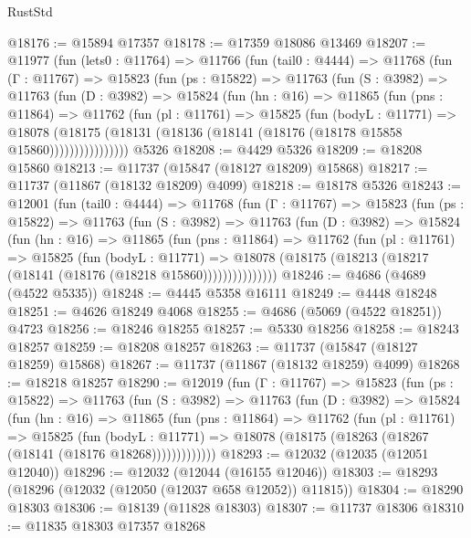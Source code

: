\begin{lexlean}{RustStd}
\begin{coremodule}
@18176 := @15894 @17357
@18178 := @17359 @18086 @13469
@18207 := @11977
    (fun (lets0 : @11764) =>
    @11766
      (fun (tail0 : @4444) =>
      @11768
        (fun (Γ : @11767) =>
        @15823
          (fun (ps : @15822) =>
          @11763
            (fun (S : @3982) =>
            @11763
              (fun (D : @3982) =>
              @15824
                (fun (hn : @16) =>
                @11865
                  (fun (pns : @11864) =>
                  @11762
                    (fun (pl : @11761) =>
                    @15825
                      (fun (bodyL : @11771) =>
                      @18078
                        (@18175
                          (@18131 (@18136 (@18141 (@18176 (@18178 @15858 @15860))))))))))))))))
    @5326
@18208 := @4429 @5326
@18209 := @18208 @15860
@18213 := @11737 (@15847 (@18127 @18209) @15868)
@18217 := @11737 (@11867 (@18132 @18209) @4099)
@18218 := @18178 @5326
@18243 := @12001
    (fun (tail0 : @4444) =>
    @11768
      (fun (Γ : @11767) =>
      @15823
        (fun (ps : @15822) =>
        @11763
          (fun (S : @3982) =>
          @11763
            (fun (D : @3982) =>
            @15824
              (fun (hn : @16) =>
              @11865
                (fun (pns : @11864) =>
                @11762
                  (fun (pl : @11761) =>
                  @15825
                    (fun (bodyL : @11771) =>
                    @18078 (@18175 (@18213 (@18217 (@18141 (@18176 (@18218 @15860)))))))))))))))
@18246 := @4686 (@4689 (@4522 @5335))
@18248 := @4445 @5358 @16111
@18249 := @4448 @18248
@18251 := @4626 @18249 @4068
@18255 := @4686 (@5069 (@4522 @18251)) @4723
@18256 := @18246 @18255
@18257 := @5330 @18256
@18258 := @18243 @18257
@18259 := @18208 @18257
@18263 := @11737 (@15847 (@18127 @18259) @15868)
@18267 := @11737 (@11867 (@18132 @18259) @4099)
@18268 := @18218 @18257
@18290 := @12019
    (fun (Γ : @11767) =>
    @15823
      (fun (ps : @15822) =>
      @11763
        (fun (S : @3982) =>
        @11763
          (fun (D : @3982) =>
          @15824
            (fun (hn : @16) =>
            @11865
              (fun (pns : @11864) =>
              @11762
                (fun (pl : @11761) =>
                @15825
                  (fun (bodyL : @11771) =>
                  @18078 (@18175 (@18263 (@18267 (@18141 (@18176 @18268)))))))))))))
@18293 := @12032 (@12035 (@12051 @12040))
@18296 := @12032 (@12044 (@16155 @12046))
@18303 := @18293 (@18296 (@12032 (@12050 (@12037 @658 @12052)) @11815))
@18304 := @18290 @18303
@18306 := @18139 (@11828 @18303)
@18307 := @11737 @18306
@18310 := @11835 @18303 @17357 @18268

\end{coremodule}
\end{lexlean}
